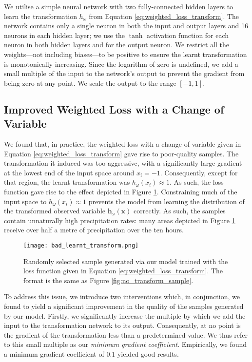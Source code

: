 \documentclass[ oneside,%
                    author={George Herbert},
                    degree={MSci},
                     title={Diffusion Models for Time-Evolving Precipitation Fields},
                  subtitle={}]{dissertation}
\begin{document}
We utilise a simple neural network with two fully-connected hidden layers to learn the transformation $h_\omega$ from Equation \ref{eq:weighted_loss_transform}. The network contains only a single neuron in both the input and output layers and 16 neurons in each hidden layer; we use the $\tanh$ activation function for each neuron in both hidden layers and for the output neuron. We restrict all the weights---not including biases---to be positive to ensure the learnt transformation is monotonically increasing. Since the logarithm of zero is undefined, we add a small multiple of the input to the network's output to prevent the gradient from being zero at any point. We scale the output to the range $[-1,1]$.

\subsection{Improved Weighted Loss with a Change of Variable}

We found that, in practice, the weighted loss with a change of variable given in Equation \ref{eq:weighted_loss_transform} gave rise to poor-quality samples. The transformation it induced was too aggressive, with a significantly large gradient at the lowest end of the input space around $x_i=-1$. Consequently, except for that region, the learnt transformation was $h_\omega(x_i)\approx 1$. As such, the loss function gave rise to the effect depicted in Figure \ref{fig:bad_learnt_transform}. Constraining much of the input space to $h_\omega(x_i)\approx 1$ prevents the model from learning the distribution of the transformed observed variable $\mathbf{h}_\omega(\mathbf{x})$ correctly. As such, the samples contain unnaturally high precipitation rates: many areas depicted in Figure \ref{fig:bad_learnt_transform} receive over half a metre of precipitation over the ten hours.

\begin{figure}[htbp]
      \centering
      \texttt{[image: bad\_learnt\_transform.png]}
      \caption{Randomly selected sample generated via our model trained with the loss function given in Equation \ref{eq:weighted_loss_transform}. The format is the same as Figure \ref{fig:no_transform_sample}.}
      \label{fig:bad_learnt_transform}
\end{figure}

To address this issue, we introduce two interventions which, in conjunction, we found to yield a significant improvement in the quality of the samples generated by our model. Firstly, we significantly increase the multiple by which we add the input to the transformation network to its output. Consequently, at no point is the gradient of the transformation less than a predetermined value. We thus refer to this small multiple as our \textit{minimum gradient coefficient}. Empirically, we found a minimum gradient coefficient of 0.1 yielded good results.
\end{document}
